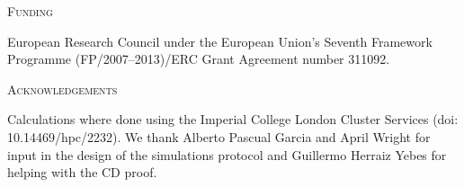 \documentclass[12pt,letterpaper]{article}
\renewcommand{\section}[1]{%
\bigskip
\begin{center}
\begin{Large}
\normalfont\scshape #1
\medskip
\end{Large}
\end{center}}
\begin{document}
\section{Funding}
European Research Council under the European Union’s Seventh Framework Programme (FP/2007–2013)/ERC Grant Agreement number 311092.


\section{Acknowledgements}
Calculations where done using the Imperial College London Cluster Services (doi: 10.14469/hpc/2232).
We thank Alberto Pascual Garcia and April Wright for input in the design of the simulations protocol and Guillermo Herraiz Yebes for helping with the CD proof.






\end{document}

